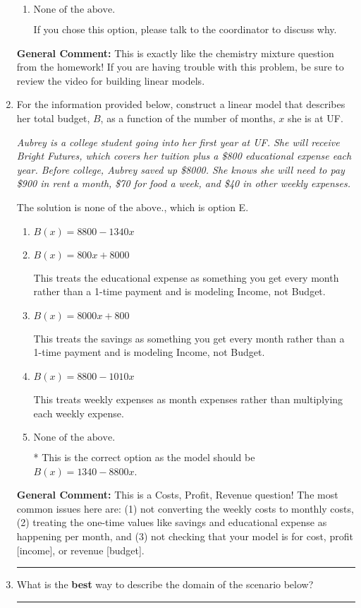 \documentclass{extbook}[14pt]
\newcommand{\litem}[1]{\item #1

\rule{\textwidth}{0.4pt}}
\begin{document}
\begin{enumerate}
{\begin{enumerate}[label=\Alph*.]
This models the cost of the high-quality bean only, not the blended beans.
\item \( \text{None of the above.} \)

If you chose this option, please talk to the coordinator to discuss why.
\end{enumerate}

\textbf{General Comment:} This is exactly like the chemistry mixture question from the homework! If you are having trouble with this problem, be sure to review the video for building linear models.
}
\litem{
For the information provided below, construct a linear model that describes her total budget, $B$, as a function of the number of months, $x$ she is at UF.

\begin{center}
    \textit{ Aubrey is a college student going into her first year at UF. She will receive Bright Futures, which covers her tuition plus a \$800 educational expense each year. Before college, Aubrey saved up \$8000. She knows she will need to pay \$900 in rent a month, \$70 for food a week, and \$40 in other weekly expenses. }
\end{center}
The solution is \( \text{none of the above.} \), which is option E.\begin{enumerate}[label=\Alph*.]
\item \( B(x) = 8800 - 1340 x \)


\item \( B(x) = 800 x + 8000 \)

This treats the educational expense as something you get every month rather than a 1-time payment and is modeling Income, not Budget.
\item \( B(x) = 8000 x + 800 \)

This treats the savings as something you get every month rather than a 1-time payment and is modeling Income, not Budget.
\item \( B(x) = 8800 - 1010 x \)

This treats weekly expenses as month expenses rather than multiplying each weekly expense.
\item \( \text{None of the above.} \)

* This is the correct option as the model should be $B(x) = 1340 - 8800 x$.
\end{enumerate}

\textbf{General Comment:} This is a Costs, Profit, Revenue question! The most common issues here are: (1) not converting the weekly costs to monthly costs, (2) treating the one-time values like savings and educational expense as happening per month, and (3) not checking that your model is for cost, profit [income], or revenue [budget].
}
\litem{
What is the \textbf{best} way to describe the domain of the scenario below?

}
\end{enumerate}
\end{document}
